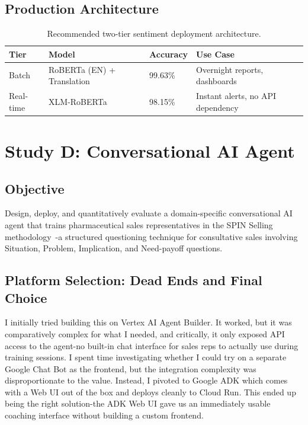 \documentclass[11pt,a4paper]{article}
\begin{document}
\subsection{Production Architecture}

\begin{table}[H]
\caption{Recommended two-tier sentiment deployment architecture.}
\setlength{\tabcolsep}{6pt}
\renewcommand{\arraystretch}{1.4}
\begin{tabular}{l l l l}
\toprule
\textbf{Tier} & \textbf{Model} & \textbf{Accuracy} & \textbf{Use Case} \\
\midrule
Batch & RoBERTa (EN) + Translation & 99.63\% & Overnight reports, dashboards \\
Real-time & XLM-RoBERTa & 98.15\% & Instant alerts, no API dependency \\
\bottomrule
\end{tabular}
\end{table}

\section{Study D: Conversational AI Agent}

\subsection{Objective}
Design, deploy, and quantitatively evaluate a domain-specific conversational AI agent that trains pharmaceutical sales representatives in the SPIN Selling methodology~\cite{rackham1988spin}-a structured questioning technique for consultative sales involving Situation, Problem, Implication, and Need-payoff questions.

\subsection{Platform Selection: Dead Ends and Final Choice}

I initially tried building this on Vertex AI Agent Builder. It worked, but it was comparatively complex for what I needed, and critically, it only exposed API access to the agent-no built-in chat interface for sales reps to actually use during training sessions. I spent time investigating whether I could try on a separate Google Chat Bot as the frontend, but the integration complexity was disproportionate to the value. Instead, I pivoted to Google ADK which comes with a Web UI out of the box and deploys cleanly to Cloud Run. This ended up being the right solution-the ADK Web UI gave us an immediately usable coaching interface without building a custom frontend.
\end{document}
